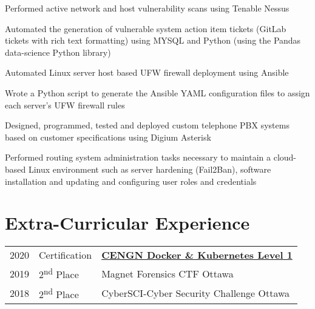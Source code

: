 \documentclass[letterpaper]{deedy-resume} %
\begin{document}
\begin{minipage}[t]{0.66\textwidth}
\sectionspace %



\begin{tightitemize}
\item Performed active network and host vulnerability scans using Tenable Nessus
\item Automated the generation of vulnerable system action item tickets (GitLab tickets with rich text formatting) using MYSQL and Python (using the Pandas data-science Python library)
\item Automated Linux server host based UFW firewall deployment using Ansible
\item Wrote a Python script to generate the Ansible YAML configuration files to assign each server’s UFW firewall rules
\end{tightitemize}

\sectionspace %


\begin{tightitemize}
	\item Designed, programmed, tested and deployed custom telephone PBX systems based on customer specifications using Digium Asterisk
	\item Performed routing system administration tasks necessary to maintain a cloud-based Linux environment such as server hardening (Fail2Ban), software installation and updating and configuring user roles and credentials 
\end{tightitemize}

\section{Extra-Curricular Experience} 

\begin{tabular}{rll}
2020	 & Certification & \href{https://www.credly.com/badges/7a6c2383-9563-4d67-9878-a40bee831e53?source=linked_in_profile}{\bf CENGN Docker \& Kubernetes Level 1} \\
2019	 & 2\textsuperscript{nd} Place & Magnet Forensics CTF Ottawa \\
2018	 & 2\textsuperscript{nd} Place & CyberSCI-Cyber Security Challenge Ottawa\\
\end{tabular}


\end{minipage} %
\end{document}
